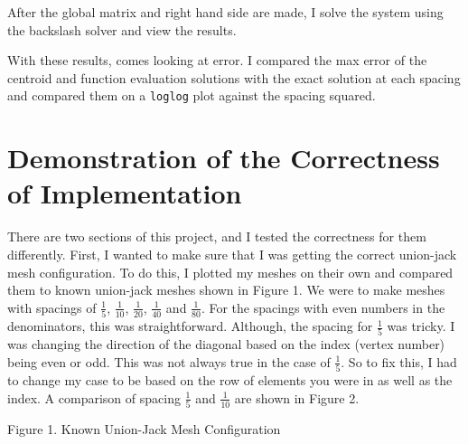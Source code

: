 \documentclass[11pt, oneside]{article}   	%
\begin{document}
After the global matrix and right hand side are made, I solve the system using the backslash solver and view the results.

With these results, comes looking at error. I compared the max error of the centroid and function evaluation solutions with the exact solution at each spacing and compared them on a \texttt{loglog} plot against the spacing squared.

\section{Demonstration of the Correctness of Implementation}

There are two sections of this project, and I tested the correctness for them differently. First, I wanted to make sure that I was getting the correct union-jack mesh configuration. To do this, I plotted my meshes on their own and compared them to known union-jack meshes shown in Figure 1. We were to make meshes with spacings of $\frac{1}{5}$, $\frac{1}{10}$, $\frac{1}{20}$, $\frac{1}{40}$ and $\frac{1}{80}$. For the spacings with even numbers in the denominators, this was straightforward. Although, the spacing for $\frac{1}{5}$ was tricky. I was changing the direction of the diagonal based on the index (vertex number) being even or odd. This was not always true in the case of $\frac{1}{5}$. So to fix this, I had to change my case to be based on the row of elements you were in as well as the index. A comparison of spacing $\frac{1}{5}$ and $\frac{1}{10}$ are shown in Figure 2.

\vspace{5mm}

\centerline {}
\centerline{Figure 1. Known Union-Jack Mesh Configuration}
\end{document}
